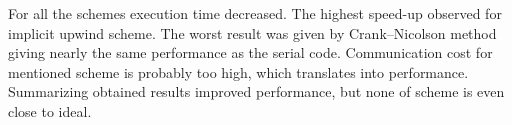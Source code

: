 	For all the schemes execution time decreased. The highest \gls{speed-up} observed for implicit upwind scheme. The worst result was given by Crank--Nicolson method giving nearly the same performance as the serial code. Communication cost for mentioned scheme is probably too high, which translates into performance. Summarizing obtained results improved performance, but none of scheme is even close to ideal.